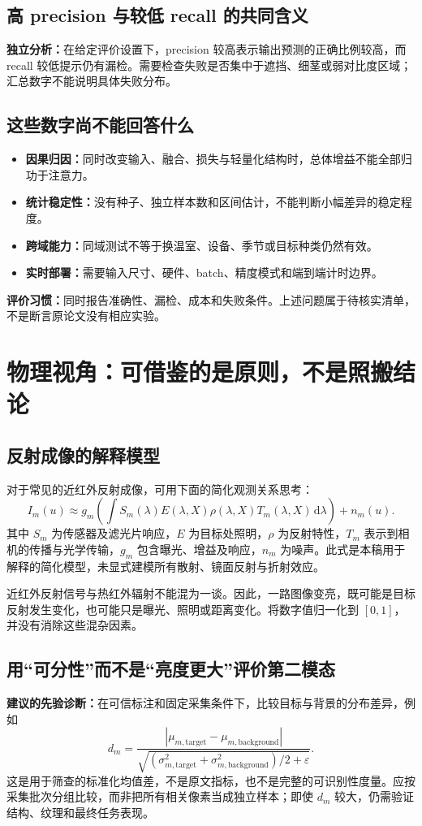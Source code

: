 \documentclass[UTF8,a4paper,11pt,fontset=windows]{ctexart}
\newcommand{\newpagepart}{\clearpage}
\begin{document}
\subsection{高 precision 与较低 recall 的共同含义}
\textbf{独立分析：}在给定评价设置下，precision 较高表示输出预测的正确比例较高，而 recall 较低提示仍有漏检。需要检查失败是否集中于遮挡、细茎或弱对比度区域；汇总数字不能说明具体失败分布。

\subsection{这些数字尚不能回答什么}
\begin{itemize}
  \item \textbf{因果归因：}同时改变输入、融合、损失与轻量化结构时，总体增益不能全部归功于注意力。
  \item \textbf{统计稳定性：}没有种子、独立样本数和区间估计，不能判断小幅差异的稳定程度。
  \item \textbf{跨域能力：}同域测试不等于换温室、设备、季节或目标种类仍然有效。
  \item \textbf{实时部署：}需要输入尺寸、硬件、batch、精度模式和端到端计时边界。
\end{itemize}
\noindent\textbf{评价习惯：}同时报告准确性、漏检、成本和失败条件。上述问题属于待核实清单，不是断言原论文没有相应实验。

\newpagepart
\section{物理视角：可借鉴的是原则，不是照搬结论}
\subsection{反射成像的解释模型}
对于常见的近红外反射成像，可用下面的简化观测关系思考：
\begin{equation}
 I_m(u)\approx g_m\!\left(\int S_m(\lambda)E(\lambda,X)
 \rho(\lambda,X)T_m(\lambda,X)\,\mathrm d\lambda\right)+n_m(u).
\end{equation}
其中 $S_m$ 为传感器及滤光片响应，$E$ 为目标处照明，$\rho$ 为反射特性，$T_m$ 表示到相机的传播与光学传输，$g_m$ 包含曝光、增益及响应，$n_m$ 为噪声。此式是本稿用于解释的简化模型，未显式建模所有散射、镜面反射与折射效应。

近红外反射信号与热红外辐射不能混为一谈\cite{nasa}。因此，一路图像变亮，既可能是目标反射发生变化，也可能只是曝光、照明或距离变化。将数字值归一化到 $[0,1]$，并没有消除这些混杂因素。

\subsection{用“可分性”而不是“亮度更大”评价第二模态}
\textbf{建议的先验诊断：}在可信标注和固定采集条件下，比较目标与背景的分布差异，例如
\begin{equation}
 d_m=\frac{|\mu_{m,\mathrm{target}}-\mu_{m,\mathrm{background}}|}
 {\sqrt{(\sigma^2_{m,\mathrm{target}}+\sigma^2_{m,\mathrm{background}})/2+\varepsilon}}.
\end{equation}
这是用于筛查的标准化均值差，不是原文指标，也不是完整的可识别性度量。应按采集批次分组比较，而非把所有相关像素当成独立样本；即使 $d_m$ 较大，仍需验证结构、纹理和最终任务表现。
\end{document}
